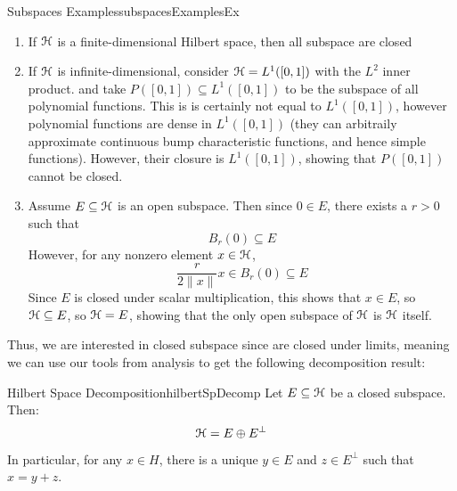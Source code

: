 \documentclass[oneside]{book}
\newcommand{\EH}{\EuScript{H}}
\newcommand{\sse}{\subseteq}
\begin{document}
\begin{example}{Subspaces Examples}{subspacesExamplesEx}
\begin{enumerate}
	\item If $\EH$ is a finite-dimensional Hilbert space, then all subspace are closed
	\item If $\EH$ is infinite-dimensional, consider $\EH = L^1([0,1])$ with the $L^2$ inner product. and take
		$P([0,1]) \sse L^1([0,1])$ to be the subspace of all polynomial functions. This is is certainly not equal to
		$L^1([0,1])$, however polynomial functions are dense in $L^1([0,1])$ (they can arbitraily approximate
		continuous bump characteristic functions, and hence simple functions). However, their closure is
		$L^1([0,1])$, showing that $P([0,1])$ cannot be closed.
	\item Assume $E \sse \EH$ is an open subspace. Then since $0 \in E$, there exists a $r > 0$ such that
		\[
			B_r(0) \sse E
		\]
		However, for any nonzero element $x \in \EH$,
		\[
			\frac{r}{2\|x\|}x \in B_r(0) \sse E
		\]
		Since $E$ is closed under scalar multiplication, this shows that $x \in E$, so $\EH \sse E$, so $\EH = E$,
		showing that the only open subspace of $\EH$ is $\EH$ itself.
\end{enumerate}
\end{example}

Thus, we are interested in closed subspace since are closed under limits, meaning we can use our tools from analysis to
get the following decomposition result:

\begin{thm}{Hilbert Space Decomposition}{hilbertSpDecomp}
Let $E \sse \EH$ be a closed subspace. Then:
\[
	\EH = E\oplus E^\perp
\]
In particular, for any $ x\in H$, there is a unique $y\in E$ and $z \in E^\perp$ such that $x = y + z$.
\end{thm}
\end{document}
